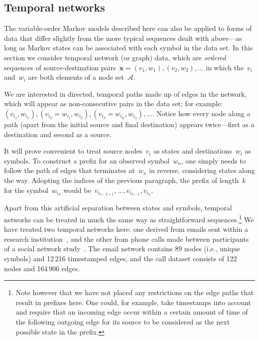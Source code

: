 \documentclass[11pt,a4paper]{article}
\newcommand\mc[1]{\mathcal{#1}}               %
\newcommand\ub[1]{\symbf{#1}}                 %
\newcommand\peq{\mathop{=}}              %
\begin{document}
\subsection{Temporal networks}\label{sec:temporal networks} %

The variable-order Markov models described here can also be applied to forms of
data that differ slightly from the more typical sequences dealt with above---as
long as Markov states can be associated with each symbol in the data set. In
this section we consider temporal network (or graph) data, which are
\emph{ordered} sequences of source-destination pairs~\(\ub{x} = (v_1, w_1),
(v_2, w_2), \dots\) in which the~\(v_i\) and~\(w_i\) are both elements of a node
set~\(\mc{A}\).

We are interested in directed, temporal paths made up of edges in the network,
which will appear as non-consecutive pairs in the data set; for example:
\((v_{i_1}, w_{i_1}), (v_{i_2} \peq w_{i_1}, w_{i_2}), (v_{i_3} \peq w_{i_w},
w_{i_3}), \dots\). Notice how every node along a path (apart from the initial
source and final destination) appears twice---first as a destination and second
as a source.

It will prove convenient to treat source nodes~\(v_i\) as states and
destinations~\(w_i\) as symbols. To construct a prefix for an observed
symbol~\(w_n\), one simply needs to follow the path of edges that terminates
at~\(w_n\) in reverse, considering states along the way. Adopting the indices of
the previous paragraph, the prefix of length~\(k\) for the symbol~\(w_{i_n}\)
would be~\(v_{i_{n-k+1}}, \dots, v_{i_{n-1}}, v_{i_n}\).

Apart from this artificial separation between states and symbols, temporal
networks can be treated in much the same way as straightforward
sequences.\footnote{Note however that we have not placed any restrictions on the
edge paths that result in prefixes here. One could, for example, take timestamps
into account and require that an incoming edge occur within a certain amount of
time of the following outgoing edge for its source to be considered as the next
possible state in the prefix.} We have treated two temporal networks here: one
derived from emails sent within a research institution~\cite{snapnets}, and the
other from phone calls made between participants of a social network
study~\cite{aharony2011social}. The email network contains 89 nodes (i.e.,
unique symbols) and 12\,216 timestamped edges, and the call dataset consists of
122 nodes and 164\,906 edges.
\end{document}
